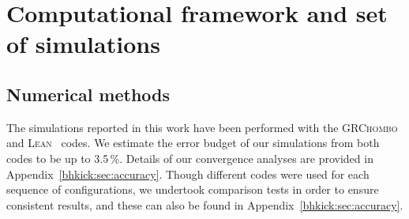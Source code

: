\section{Computational framework and set of simulations}
\label{bhkick:sec:NR}
% 
\subsection{Numerical methods}

The simulations reported in this work have been performed with the
\textsc{GRChombo}~\cite{Clough:2015sqa, GRChomboWebsite} and 
\textsc{Lean}~\cite{Sperhake:2006cy} codes.
We estimate the error budget of our simulations from both codes to be up to 3.5\,\%. Details of our convergence analyses are provided in 
Appendix~\ref{bhkick:sec:accuracy}. Though different codes were
used for each sequence of configurations, we undertook comparison tests 
in order to ensure consistent results, and these can also be found in
Appendix~\ref{bhkick:sec:accuracy}.

